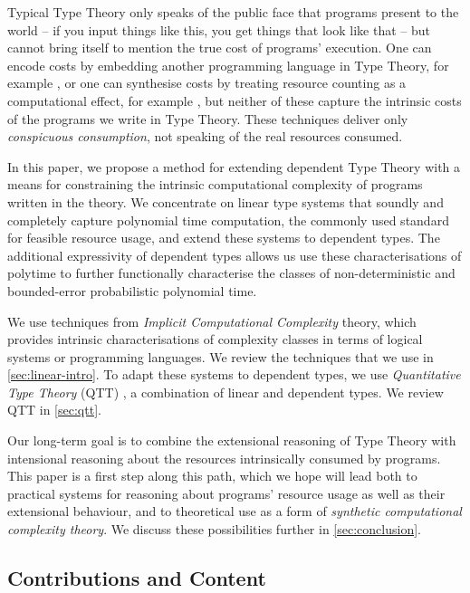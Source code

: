 \documentclass[acmsmall,screen]{acmart}
\begin{document}
Typical Type Theory only speaks of the public face that programs
present to the world -- if you input things like this, you get things
that look like that -- but cannot bring itself to mention the true
cost of programs' execution. One can encode costs by embedding another
programming language in Type Theory, for example \cite{GueneauCP18},
or one can synthesise costs by treating resource counting as a
computational effect, for example \cite{Danielsson08,NiuSGH22}, but
neither of these capture the intrinsic costs of the programs we write
in Type Theory. These techniques deliver only \emph{conspicuous
  consumption}, not speaking of the real resources consumed.

In this paper, we propose a method for extending dependent Type Theory
with a means for constraining the intrinsic computational complexity
of programs written in the theory. We concentrate on linear type
systems that soundly and completely capture polynomial time
computation, the commonly used standard for feasible resource usage,
and extend these systems to dependent types. The additional
expressivity of dependent types allows us use these characterisations
of polytime to further functionally characterise the classes of
non-deterministic and bounded-error probabilistic polynomial time.

We use techniques from \emph{Implicit Computational Complexity}
theory, which provides intrinsic characterisations of complexity
classes in terms of logical systems or programming languages. We
review the techniques that we use in \autoref{sec:linear-intro}. To
adapt these systems to dependent types, we use \emph{Quantitative Type
  Theory} (QTT) \cite{atkey18qtt,mcbride16}, a combination of linear
and dependent types. We review QTT in \autoref{sec:qtt}.

Our long-term goal is to combine the extensional reasoning of Type
Theory with intensional reasoning about the resources intrinsically
consumed by programs. This paper is a first step along this path,
which we hope will lead both to practical systems for reasoning about
programs' resource usage as well as their extensional behaviour, and
to theoretical use as a form of \emph{synthetic computational
  complexity theory}. We discuss these possibilities further in
\autoref{sec:conclusion}.

\subsection{Contributions and Content}
\end{document}
